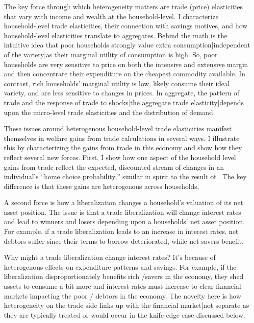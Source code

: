 \documentclass[12pt,pdftex]{article}
\begin{document}
\begin{onehalfspacing}
The key force through which heterogeneity matters are trade (price) elasticities that vary with income and wealth at the household-level. I characterize household-level trade elasticities, their connection with savings motives, and how household-level elasticities translate to aggregates. Behind the math is the intuitive idea that poor households strongly value extra consumption|independent of the variety|as their marginal utility of consumption is high. So, poor households are very sensitive to price on both the intensive and extensive margin and then concentrate their expenditure on the cheapest commodity available. In contrast, rich households' marginal utility is low, likely consume their ideal variety, and are less sensitive to changes in prices. In aggregate, the pattern of trade and the response of trade to shocks|the aggregate trade elasticity|depends upon the micro-level trade elasticities and the distribution of demand.

These issues around heterogenous household-level trade elasticities manifest themselves in welfare gains from trade calculations in several ways. I illustrate this by characterizing the gains from trade in this economy and show how they reflect several new forces. First, I show how one aspect of the household level gains from trade reflect the expected, discounted stream of changes in an individual's ``home choice probability,''  similar in spirit to the result of \citet*{arkolakis2012new}. The key difference is that these gains are heterogenous across households.

A second force is how a liberalization changes a household's valuation of its net asset position. The issue is that a trade liberalization will change interest rates and lead to winners and losers depending upon a households' net asset position. For example, if a trade liberalization leads to an increase in interest rates, net debtors suffer since their terms to borrow deteriorated, while net savers benefit.

Why might a trade liberalization change interest rates? It's because of heterogenous effects on expenditure patterns and savings. For example, if the liberalization disproportionately benefits rich /savers in the economy, they shed assets to consume a bit more and interest rates must increase to clear financial markets impacting the poor / debtors in the economy. The novelty here is how heterogeneity on the trade side links up with the financial market|not separate as they are typically treated or would occur in the knife-edge case discussed below.


\end{onehalfspacing}
\end{document}

